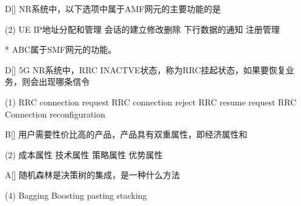\begin{choice}{D}[]
    NR系统中，以下选项中属于AMF网元的主要功能的是
    \begin{tasks}(2)
        \task UE IP地址分配和管理
        \task 会话的建立修改删除
        \task 下行数据的通知
        \task 注册管理
    \end{tasks}
\end{choice}
\begin{solution}*
    ABC属于SMF网元的功能。

\end{solution}


\begin{choice}{D}[]
    5G NR系统中，RRC INACTVE状态，称为RRC挂起状态，如果要恢复业务，则会出现哪条信令
    \begin{tasks}(1)
        \task RRC connection request
        \task RRC connection reject
        \task RRC resume request
        \task RRC Connection reconfiguration
    \end{tasks}
\end{choice}

\begin{choice}{B}[]
    用户需要性价比高的产品，产品具有双重属性，即经济属性和
    \begin{tasks}(2)
        \task 成本属性
        \task 技术属性
        \task 策略属性
        \task 优势属性
    \end{tasks}
\end{choice}




\begin{choice}{A}[]
    随机森林是决策树的集成，是一种什么方法
    \begin{tasks}(4)
        \task Bagging
        \task Boosting
        \task pasting
        \task stacking
    \end{tasks}
\end{choice}



